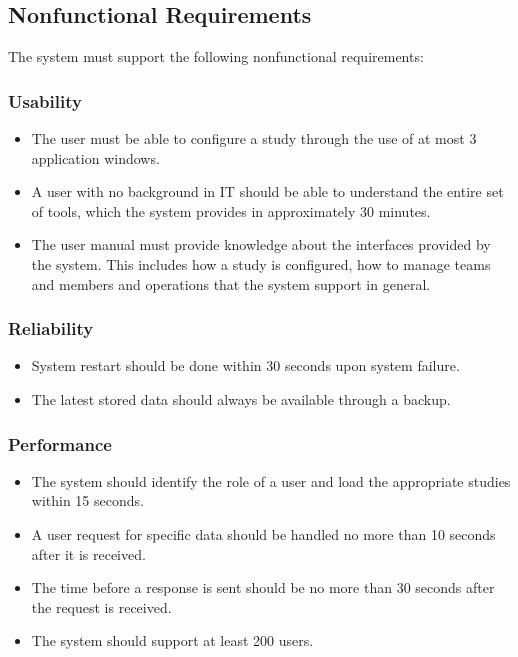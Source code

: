 \newpage

\subsection{Nonfunctional Requirements}
The system must support the following nonfunctional requirements:

\subsubsection{Usability}

\begin{itemize}
\item The user must be able to configure a study through the use of at most 3 application windows.
\item A user with no background in IT should be able to understand the entire set of tools, which the system provides in approximately 30 minutes. 
\item The user manual must provide knowledge about the interfaces provided by the system. This includes how a study is configured, how to manage teams and members and operations that the system support in general. 
\end{itemize}

\subsubsection{Reliability}

\begin{itemize}
\item System restart should be done within 30 seconds upon system failure.
\item The latest stored data should always be available through a backup.
\end{itemize}

\subsubsection{Performance}

\begin{itemize}
\item The system should identify the role of a user and load the appropriate studies within 15 seconds.
\item A user request for specific data should be handled no more than 10 seconds after it is received.
\item The time before a response is sent should be no more than 30 seconds after the request is received.
\item The system should support at least 200 users.
\end{itemize}

